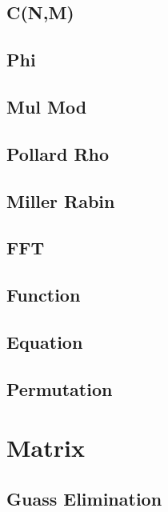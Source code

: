 \documentclass[10pt,twocolumn,oneside]{article}
\begin{document}
    \subsection{C(N,M)}
    
    \subsection{Phi}
    
    \subsection{Mul Mod}
    
    \subsection{Pollard Rho}
    
    \subsection{Miller Rabin}
    
    \subsection{FFT}
    
    \subsection{Function}
    
    \subsection{Equation}
    
    \subsection{Permutation}
    
    \newpage

    \section{Matrix}
    \subsection{Guass Elimination}
\end{document}

